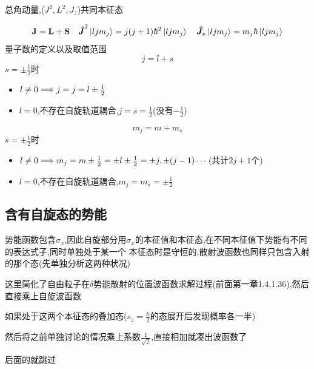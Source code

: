 \documentclass{article}
\begin{document}
            \begin{formal}
                总角动量,($J^{2},L^{2},J_{z}$)共同本征态

                $$
                \vb{J} = \vb{L} + \vb{S} \quad \vu*{J}^{2}\ket{ljm_{j}} = j(j+1) \hbar^{2} \ket{ljm_{j}} \quad 
                \vu*{J_{z}}\ket{ljm_{j}} = m_{j}\hbar\ket{ljm_{j}}
                $$
                量子数的定义以及取值范围
                $$
                j = l + s
                $$
                $s = \pm\frac{1}{2}$时
                \begin{itemize}
                    \item $l \neq 0 \Longrightarrow j = j = l \pm \frac{1}{2} $ 
                    \item $l = 0$,不存在自旋轨道耦合,$j=s=\frac{1}{2}$(没有$-\frac{1}{2}$)
                \end{itemize}
               
                $$
                m_{j} = m + m_{s}
                $$
                $s = \pm\frac{1}{2}$时
                \begin{itemize}
                    \item $l \neq 0 \Longrightarrow m_{j} = m \pm \frac{1}{2} = \pm l \pm \frac{1}{2} = \pm j ,\pm(j-1) \cdots $(共计$2j+1$个) 
                    \item $l = 0$,不存在自旋轨道耦合,$m_{j}=m_{s}=\pm \frac{1}{2}$
                \end{itemize}
            \end{formal}
        
        \subsection{含有自旋态的势能}
            势能函数包含$\sigma_{x}$,因此自旋部分用$\sigma_{x}$的本征值和本征态,在不同本征值下势能有不同的表达式子,同时单独处于某一个
            本征态时是守恒的,散射波函数也同样只包含入射的那个态(先单独分析这两种状况)
            
            这里简化了自由粒子在$\delta$势能散射的位置波函数求解过程(前面第一章1.4,1.36),然后直接乘上自旋波函数

            如果处于这两个本征态的叠加态($s_{z}= \frac{\hbar}{2}$的态展开后发现概率各一半)

            然后将之前单独讨论的情况乘上系数$\frac{1}{\sqrt{2}}$,直接相加就凑出波函数了

            后面的就跳过
\end{document}

